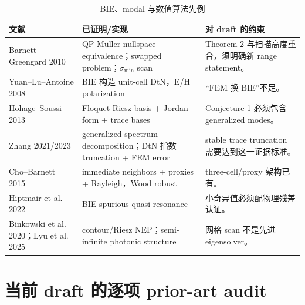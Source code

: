 \documentclass[UTF8,11pt,fontset=none]{ctexart}
\begin{document}
\begin{table}[htbp]
\centering
\caption{BIE、modal 与数值算法先例}
\small
\begin{tabularx}{\textwidth}{p{} p{} Y}
\toprule
文献 & 已证明/实现 & 对 draft 的约束 \\
\midrule
Barnett--Greengard 2010 & QP Müller nullspace equivalence；swapped problem；\(\sigma_{\min}\) scan & Theorem 2 与扫描高度重合，须明确新 range statement。 \\
Yuan--Lu--Antoine 2008 & BIE 构造 unit-cell DtN，E/H polarization & “FEM 换 BIE”不足。 \\
Hohage--Soussi 2013 & Floquet Riesz basis + Jordan form + trace bases & Conjecture 1 必须包含 generalized modes。 \\
Zhang 2021/2023 & generalized spectrum decomposition；DtN 指数 truncation + FEM error & stable trace truncation 需要达到这一证据标准。 \\
Cho--Barnett 2015 & immediate neighbors + proxies + Rayleigh，Wood robust & three-cell/proxy 架构已有。 \\
Hiptmair et al. 2022 & BIE spurious quasi-resonance & 小奇异值必须配物理残差认证。 \\
Binkowski et al. 2020；Lyu et al. 2025 & contour/Riesz NEP；semi-infinite photonic structure & 网格 scan 不是先进 eigensolver。 \\
\bottomrule
\end{tabularx}
\end{table}

\section{当前 draft 的逐项 prior-art audit}
\end{document}
